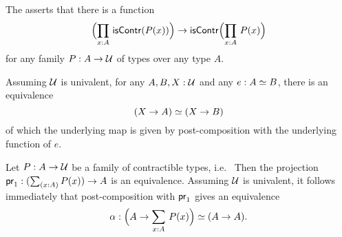 \documentclass[hott-all.tex]{subfiles}
\begin{document}
\begin{defn}\label{weakfunext}
The 
%
asserts that there is a function
\begin{equation*}
\Parens{\prd{x:A}\iscontr(P(x))} \to\iscontr\Parens{\prd{x:A}P(x)}
\end{equation*}
for any family $P:A\to\mathcal{U}$ of types over any type $A$.
\end{defn}


\begin{lem} \label{UA-eqv-hom-eqv}
Assuming $\mathcal{U}$ is univalent, for any $A,B,X:\mathcal{U}$ and any $e:A \simeq B$, there is an equivalence
\begin{equation*}
(X\to A) \simeq (X\to B)
\end{equation*}
of which the underlying map is given by post-composition with the underlying function of $e$.
\end{lem}


\begin{cor}\label{contrfamtotalpostcompequiv}
Let $P:A\to\mathcal{U}$ be a family of contractible types, i.e.\ 
Then the projection $\proj{1}:(\sm{x:A}P(x))\to A$ is an equivalence. Assuming $\mathcal{U}$ is univalent, it follows immediately that post-composition with $\mathsf{pr}_{1}$ gives an equivalence
\begin{equation*}
\alpha : \eqv{\Parens{A\to\sm{x:A}P(x)}}{(A\to A)}.
\end{equation*}
\end{cor}

%
\end{document}
